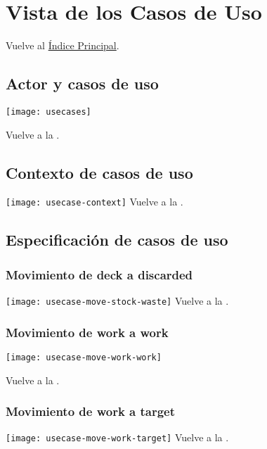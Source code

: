 \newpage{}
\section{Vista de los Casos de Uso}\label{usecasetoc}

\secttoc
Vuelve al \hyperlink{toc}{Índice Principal}.

\newpage{}
\subsection{Actor y casos de uso}
\texttt{[image: usecases]}

Vuelve a la .

\newpage{}
\subsection{Contexto de casos de uso}
\texttt{[image: usecase-context]}
Vuelve a la .

\newpage{}
\subsection{Especificación de casos de uso}

\subsubsection{Movimiento de deck a discarded}
\texttt{[image: usecase-move-stock-waste]}
Vuelve a la .

\newpage{}
\subsubsection{Movimiento de work a work}
\texttt{[image: usecase-move-work-work]}

Vuelve a la .

\newpage{}
\subsubsection{Movimiento de work a target}
\texttt{[image: usecase-move-work-target]}
Vuelve a la .

